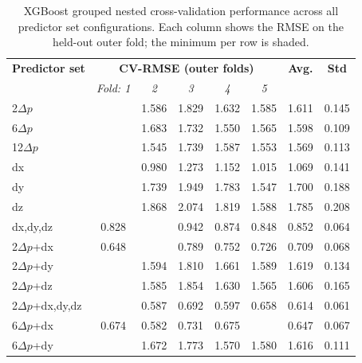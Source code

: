         \begin{table}[htbp]
        \centering
        \captionsetup{font=footnotesize}
        \caption{XGBoost grouped nested cross-validation performance across all predictor set configurations. Each column shows the RMSE on the held-out outer fold; the minimum per row is shaded.}
        \footnotesize
        \setlength{\tabcolsep}{5pt}
        \renewcommand{\arraystretch}{1.2}
        \begin{tabular}{l|ccccc|cc}
        \hline\hline
        \textbf{Predictor set} & \multicolumn{5}{c|}{\textbf{CV-RMSE (outer folds)}} & \textbf{Avg.} & \textbf{Std} \\
         & \textit{Fold: 1} & \textit{2} & \textit{3} & \textit{4} & \textit{5} & & \\
        \hline
        2$\Delta p$ & \cellcolor{gray!20}{1.423} & 1.586 & 1.829 & 1.632 & 1.585 & 1.611 & 0.145 \\
        6$\Delta p$ & \cellcolor{gray!20}{1.460} & 1.683 & 1.732 & 1.550 & 1.565 & 1.598 & 0.109 \\
        12$\Delta p$ & \cellcolor{gray!20}{1.423} & 1.545 & 1.739 & 1.587 & 1.553 & 1.569 & 0.113 \\
        dx & \cellcolor{gray!20}{0.927} & 0.980 & 1.273 & 1.152 & 1.015 & 1.069 & 0.141 \\
        dy & \cellcolor{gray!20}{1.482} & 1.739 & 1.949 & 1.783 & 1.547 & 1.700 & 0.188 \\
        dz & \cellcolor{gray!20}{1.578} & 1.868 & 2.074 & 1.819 & 1.588 & 1.785 & 0.208 \\
        dx,dy,dz & 0.828 & \cellcolor{gray!20}{0.766} & 0.942 & 0.874 & 0.848 & 0.852 & 0.064 \\
        2$\Delta p$+dx & 0.648 & \cellcolor{gray!20}{0.631} & 0.789 & 0.752 & 0.726 & 0.709 & 0.068 \\
        2$\Delta p$+dy & \cellcolor{gray!20}{1.442} & 1.594 & 1.810 & 1.661 & 1.589 & 1.619 & 0.134 \\
        2$\Delta p$+dz & \cellcolor{gray!20}{1.394} & 1.585 & 1.854 & 1.630 & 1.565 & 1.606 & 0.165 \\
        2$\Delta p$+dx,dy,dz & \cellcolor{gray!20}{0.537} & 0.587 & 0.692 & 0.597 & 0.658 & 0.614 & 0.061 \\
        6$\Delta p$+dx & 0.674 & 0.582 & 0.731 & 0.675 & \cellcolor{gray!20}{0.575} & 0.647 & 0.067 \\
        6$\Delta p$+dy & \cellcolor{gray!20}{1.482} & 1.672 & 1.773 & 1.570 & 1.580 & 1.616 & 0.111 \\

\end{tabular}
\end{table}
